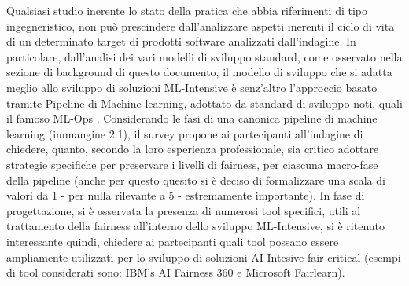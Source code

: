     	\begin{center}
    	\hspace*{-5mm}%
    \end{center}
    
    Qualsiasi studio inerente lo stato della pratica che abbia riferimenti di tipo ingegneristico, non può prescindere dall'analizzare aspetti inerenti il ciclo di vita di un determinato target di prodotti software analizzati dall'indagine. In particolare, dall'analisi dei vari modelli di sviluppo standard, come osservato nella sezione di background di questo documento, il modello di sviluppo che si adatta meglio allo sviluppo di soluzioni ML-Intensive è senz'altro l'approccio basato tramite Pipeline di Machine learning, adottato da standard di sviluppo noti, quali il famoso ML-Ops \cite{MLOps}. Considerando le fasi di una canonica pipeline di machine learning (immangine 2.1), il survey propone ai partecipanti all'indagine di chiedere, quanto, secondo la loro esperienza professionale, sia critico adottare strategie specifiche per preservare i livelli di fairness, per ciascuna macro-fase della pipeline (anche per questo quesito si è deciso di formalizzare una scala di valori da 1 - per nulla rilevante a 5 - estremamente importante). In fase di progettazione, si è osservata la presenza di numerosi tool specifici, utili al trattamento della fairness all'interno dello sviluppo ML-Intensive, si è ritenuto interessante quindi, chiedere ai partecipanti quali tool possano essere ampliamente utilizzati per lo sviluppo di soluzioni AI-Intesive fair critical (esempi di tool considerati sono: IBM's AI Fairness 360 e Microsoft Fairlearn). \\
    
    \begin{center}
    	\hspace*{-5mm}%
    \end{center}
      
